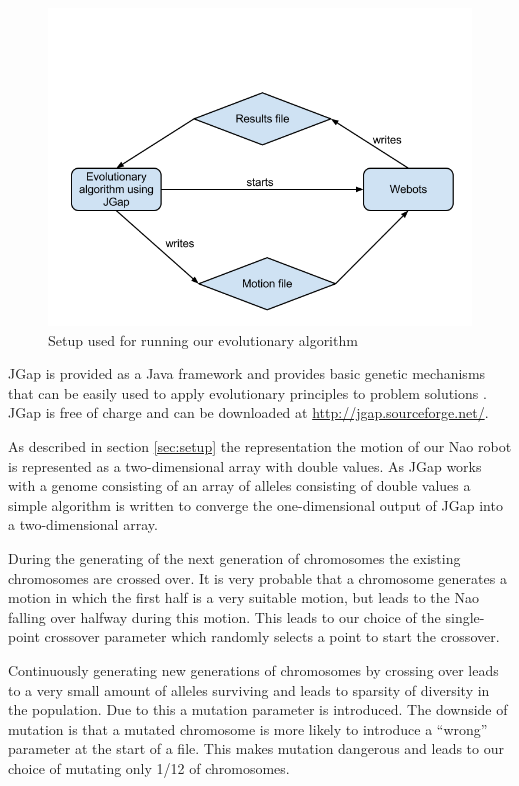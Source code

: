 \documentclass[a4paper,10pt]{article}
\begin{document}
\begin{figure}[h!]
\includegraphics{images/jgapSetup}
\caption{Setup used for running our evolutionary algorithm}
\label{fig:jgapsetup}
\end{figure}

JGap is provided as a Java framework and provides basic genetic mechanisms that can be easily used to apply evolutionary principles to problem solutions \cite{jgap}. JGap is free of charge and can be downloaded at \url{http://jgap.sourceforge.net/}. 

As described in section \ref{sec:setup} the representation the motion of our Nao robot is represented as a two-dimensional array with double values. As JGap works with a genome consisting of an array of alleles consisting of double values a simple algorithm is written to converge the one-dimensional output of JGap into a two-dimensional array. 

During the generating of the next generation of chromosomes the existing chromosomes are crossed over. It is very probable that a chromosome generates a motion in which the first half is a very suitable motion, but leads to the Nao falling over halfway during this motion. This leads to our choice of the single-point crossover parameter which randomly selects a point to start the crossover. 

Continuously generating new generations of chromosomes by crossing over leads to a very small amount of alleles surviving and leads to sparsity of diversity in the population. Due to this a mutation parameter is introduced. The downside of mutation is that a mutated chromosome is more likely to introduce a “wrong” parameter at the start of a file. This makes mutation dangerous and leads to our choice of mutating only 1/12 of chromosomes. 
\end{document}
